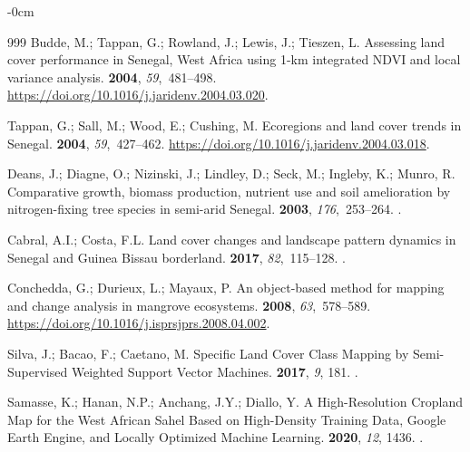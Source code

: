 \documentclass[earth,article,accept,pdftex,moreauthors]{Definitions/mdpi}
\begin{document}
{\begin{adjustwidth}{-\extralength}{0cm}
\begin{thebibliography}{999}
Budde, M.; Tappan, G.; Rowland, J.; Lewis, J.; Tieszen, L.
\newblock Assessing land cover performance in Senegal, West Africa using 1-km
  integrated NDVI and local variance analysis.
 {\bf 2004}, {\em 59},~481--498. %
\newblock
  {\url{https://doi.org/10.1016/j.jaridenv.2004.03.020}}.

Tappan, G.; Sall, M.; Wood, E.; Cushing, M.
\newblock Ecoregions and land cover trends in Senegal.
 {\bf 2004}, {\em 59},~427--462. %
  {\url{https://doi.org/10.1016/j.jaridenv.2004.03.018}}.

Deans, J.; Diagne, O.; Nizinski, J.; Lindley, D.; Seck, M.; Ingleby, K.; Munro,
  R.
\newblock Comparative growth, biomass production, nutrient use and soil
  amelioration by nitrogen-fixing tree species in semi-arid Senegal.
 {\bf 2003}, {\em 176},~253--264.
.

Cabral, A.I.; Costa, F.L.
\newblock Land cover changes and landscape pattern dynamics in Senegal and
  Guinea Bissau borderland.
 {\bf 2017}, {\em 82},~115--128.
.

Conchedda, G.; Durieux, L.; Mayaux, P.
\newblock An object-based method for mapping and change analysis in mangrove
  ecosystems.
 {\bf 2008},
  {\em 63},~578--589. %
  {\url{https://doi.org/10.1016/j.isprsjprs.2008.04.002}}.

Silva, J.; Bacao, F.; Caetano, M.
\newblock Specific Land Cover Class Mapping by Semi-Supervised Weighted Support
  Vector Machines.
 {\bf 2017}, {\em 9}, 181.
.

Samasse, K.; Hanan, N.P.; Anchang, J.Y.; Diallo, Y.
\newblock A High-Resolution Cropland Map for the West African Sahel Based on
  High-Density Training Data, Google Earth Engine, and Locally Optimized
  Machine Learning.
 {\bf 2020}, {\em 12}, 1436.
.


\end{thebibliography}
\end{adjustwidth}}
\end{document}
